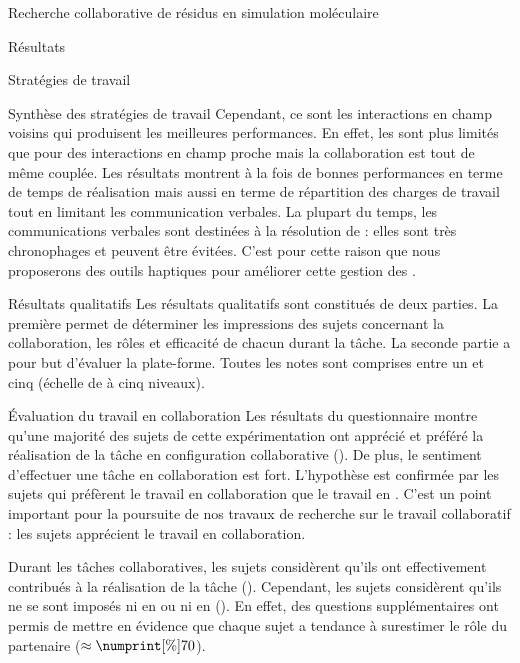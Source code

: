 \documentclass[myfrancais]{mythesis}
\begin{document}
\begin{mychapter}{Recherche collaborative de résidus en simulation moléculaire}
\begin{mysection}{Résultats}
\begin{mysubsection}{Stratégies de travail}
\begin{mysubsubsection}{Synthèse des stratégies de travail}
					Cependant, ce sont les interactions en champ voisins qui produisent les meilleures performances.
					En effet, les  sont plus limités que pour des interactions en champ proche mais la collaboration est tout de même couplée.
					Les résultats montrent à la fois de bonnes performances en terme de temps de réalisation mais aussi en terme de répartition des charges de travail tout en limitant les communication verbales.
					La plupart du temps, les communications verbales sont destinées à la résolution de  : elles sont très chronophages et peuvent être évitées.
					C'est pour cette raison que nous proposerons des outils haptiques pour améliorer cette gestion des  .
				\end{mysubsubsection}
			\end{mysubsection}
			\begin{mysubsection}{Résultats qualitatifs}
				Les résultats qualitatifs sont constitués de deux parties.
				La première permet de déterminer les impressions des sujets concernant la collaboration, les rôles et efficacité de chacun durant la tâche.
				La seconde partie a pour but d'évaluer la plate-forme.
				Toutes les notes sont comprises entre un et cinq (échelle de  à cinq niveaux).
				\begin{mysubsubsection}{Évaluation du travail en collaboration}
					Les résultats du questionnaire montre qu'une majorité des sujets de cette expérimentation ont apprécié et préféré la réalisation de la tâche en configuration collaborative ().
					De plus, le sentiment d'effectuer une tâche en collaboration est fort.
					L'hypothèse  est confirmée par les sujets qui préfèrent le travail en collaboration que le travail en .
					C'est un point important pour la poursuite de nos travaux de recherche sur le travail collaboratif : les sujets apprécient le travail en collaboration.

					Durant les tâches collaboratives, les sujets considèrent qu'ils ont effectivement contribués à la réalisation de la tâche ().
					Cependant, les sujets considèrent qu'ils ne se sont imposés ni en  ou ni en  ().
					En effet, des questions supplémentaires ont permis de mettre en évidence que chaque sujet a tendance à surestimer le rôle du partenaire ($\approx\mynum[\%]{70}$).


\end{mysubsubsection}
\end{mysubsection}
\end{mysection}
\end{mychapter}
\end{document}
